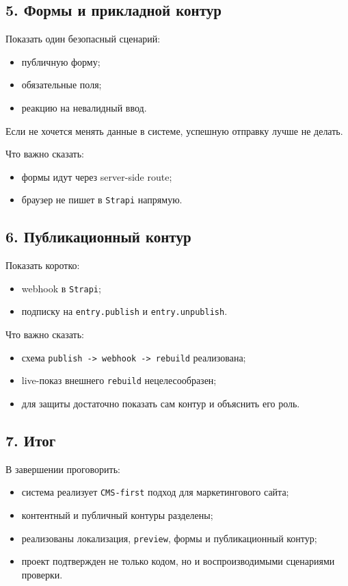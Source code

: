 \documentclass[12pt,a4paper]{article}
\begin{document}
\subsection*{5. Формы и прикладной контур}

Показать один безопасный сценарий:
\begin{itemize}
  \item публичную форму;
  \item обязательные поля;
  \item реакцию на невалидный ввод.
\end{itemize}

Если не хочется менять данные в системе, успешную отправку лучше не делать.

Что важно сказать:
\begin{itemize}
  \item формы идут через server-side route;
  \item браузер не пишет в \texttt{Strapi} напрямую.
\end{itemize}

\subsection*{6. Публикационный контур}

Показать коротко:
\begin{itemize}
  \item webhook в \texttt{Strapi};
  \item подписку на \texttt{entry.publish} и \texttt{entry.unpublish}.
\end{itemize}

Что важно сказать:
\begin{itemize}
  \item схема \texttt{publish -> webhook -> rebuild} реализована;
  \item live-показ внешнего \texttt{rebuild} нецелесообразен;
  \item для защиты достаточно показать сам контур и объяснить его роль.
\end{itemize}

\subsection*{7. Итог}

В завершении проговорить:
\begin{itemize}
  \item система реализует \texttt{CMS-first} подход для маркетингового сайта;
  \item контентный и публичный контуры разделены;
  \item реализованы локализация, \texttt{preview}, формы и публикационный контур;
  \item проект подтвержден не только кодом, но и воспроизводимыми сценариями проверки.
\end{itemize}
\end{document}
